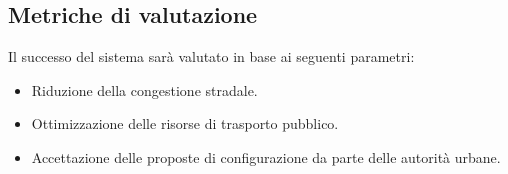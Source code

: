 \documentclass[a4paper,12pt]{article}
\begin{document}
\subsection{Metriche di valutazione}
Il successo del sistema sarà valutato in base ai seguenti parametri:
\begin{itemize}
    \item Riduzione della congestione stradale.
    \item Ottimizzazione delle risorse di trasporto pubblico.
    \item Accettazione delle proposte di configurazione da parte delle autorità urbane.
\end{itemize}
\end{document}
